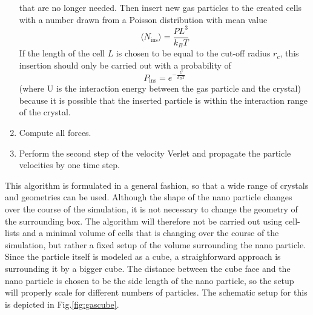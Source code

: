 \documentclass[12pt]{article}
\begin{document}
\begin{enumerate}
        that are no longer needed. Then insert new gas particles to the created cells with a number drawn from a Poisson distribution with mean value
        \begin{equation}
            \langle N_\text{ins}\rangle = \frac{PL^3}{k_BT}
        \end{equation}
        If the length of the cell $L$ is chosen to be equal to the cut-off radius $r_c$, this insertion should only be carried out with a probability of
        \begin{equation}
            P_\text{ins} = e^{-\frac{U}{k_BT}}
        \end{equation}
        (where U is the interaction energy between the gas particle and the crystal) because it is possible that the inserted particle is 
        within the interaction range of the crystal. 
    \item Compute all forces.
    \item Perform the second step of the velocity Verlet and propagate the particle velocities by one time step. 
\end{enumerate}
This algorithm is formulated in a general fashion, so that a wide range of crystals and geometries can be used. 
Although the shape of the nano particle changes over the course of the simulation, it is not necessary to change the geometry of the surrounding box.
The algorithm will therefore not be carried out using cell-lists and a minimal volume of cells that is changing over the course of the simulation, 
but rather a fixed setup of the volume surrounding the nano particle.\\ 
Since the particle itself is modeled as a cube, a straighforward approach is surrounding it by a bigger cube. The distance between the cube face and the nano
particle is chosen to be the side length of the nano particle, so the setup will properly scale for different numbers of particles. 
The schematic setup for this is depicted in Fig.\ref{fig:gascube}.
\end{document}
